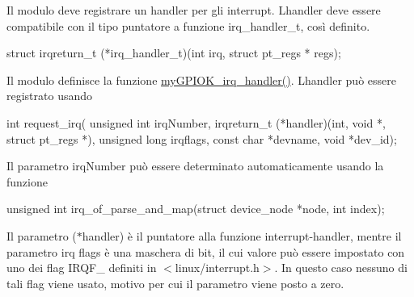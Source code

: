 Il modulo deve registrare un handler per gli interrupt. L\textquotesingle{}handler deve essere compatibile con il tipo puntatore a funzione irq\+\_\+handler\+\_\+t, così definito. 
\begin{DoxyCode}
\textcolor{keyword}{struct }irqreturn\_t (*irq\_handler\_t)(\textcolor{keywordtype}{int} irq, \textcolor{keyword}{struct} pt\_regs * regs);
\end{DoxyCode}
 Il modulo definisce la funzione \hyperlink{group___linux-_driver_ga2fc230a12a97aa63e43b2dc4aec73511}{my\+G\+P\+I\+O\+K\+\_\+irq\+\_\+handler()}. L\textquotesingle{}handler può essere registrato usando 
\begin{DoxyCode}
\textcolor{keywordtype}{int} request\_irq(    \textcolor{keywordtype}{unsigned} \textcolor{keywordtype}{int} irqNumber,
                    irqreturn\_t (*handler)(\textcolor{keywordtype}{int}, \textcolor{keywordtype}{void} *, \textcolor{keyword}{struct} pt\_regs *),
                    \textcolor{keywordtype}{unsigned} \textcolor{keywordtype}{long} irqflags,
                    \textcolor{keyword}{const} \textcolor{keywordtype}{char} *devname,
                    \textcolor{keywordtype}{void} *dev\_id);
\end{DoxyCode}
 Il parametro irq\+Number può essere determinato automaticamente usando la funzione 
\begin{DoxyCode}
\textcolor{keywordtype}{unsigned} \textcolor{keywordtype}{int} irq\_of\_parse\_and\_map(\textcolor{keyword}{struct} device\_node *node, \textcolor{keywordtype}{int} index);
\end{DoxyCode}
 Il parametro ($\ast$handler) è il puntatore alla funzione interrupt-\/handler, mentre il parametro irq flags è una maschera di bit, il cui valore può essere impostato con uno dei flag I\+R\+Q\+F\+\_\+ definiti in $<$linux/interrupt.\+h$>$. In questo caso nessuno di tali flag viene usato, motivo per cui il parametro viene posto a zero.

